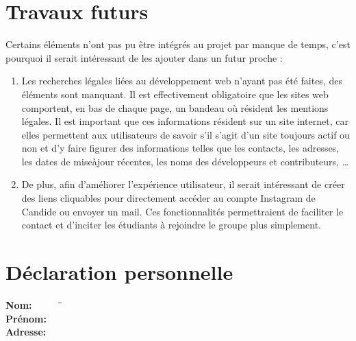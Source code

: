 \documentclass[a4,10pt,french]{sphinxmanual}
\begin{document}
\chapter{Travaux futurs}
\label{\detokenize{chapitre-05:travaux-futurs}}\label{\detokenize{chapitre-05::doc}}
\sphinxAtStartPar
Certains éléments n’ont pas pu être intégrés au projet par manque de temps, c’est pourquoi il serait intéressant de les ajouter dans un futur proche :
\begin{enumerate}
%
\item {} 
\sphinxAtStartPar
Les recherches légales liées au développement web n’ayant pas été faites, des éléments sont manquant. Il est effectivement obligatoire que les sites web comportent, en bas de chaque page, un bandeau où résident les mentions légales. Il est important que ces informations résident sur un site internet, car elles permettent aux utilisateurs de savoir s’il s’agit d’un site toujours actif ou non et d’y faire figurer des informations telles que les contacts, les adresses, les dates de mise\sphinxhyphen{}à\sphinxhyphen{}jour récentes, les noms des développeurs et contributeurs, …

\item {} 
\sphinxAtStartPar
De plus, afin d’améliorer l’expérience utilisateur, il serait intéressant de créer des liens cliquables pour directement accéder au compte Instagram de Candide ou envoyer un mail. Ces fonctionnalités permettraient de faciliter le contact et d’inciter les étudiants à rejoindre le groupe plus simplement.

\end{enumerate}

\appendix



\chapter{Déclaration personnelle}
\label{\detokenize{chapitre-06:declaration-personnelle}}\label{\detokenize{chapitre-06::doc}}
{
\large
\begin{tabbing}
\textbf{Nom:} ~~~~~ \=  \= \studentlastname \\
\textbf{Prénom:}~~~ \>  \> \studentfirstname \\
\textbf{Adresse:}~~ \>  \> \studentaddress
\end{tabbing} 
}
\end{document}
